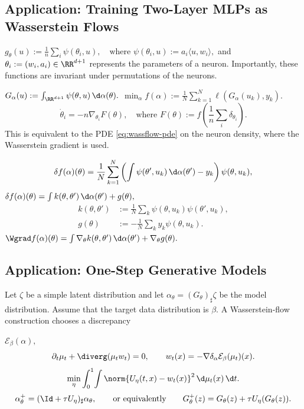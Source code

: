 \subsection{Application: Training Two-Layer MLPs as Wasserstein Flows}
\(g_\theta(u):= \frac{1}{n} \sum_i \psi(\theta_i, u), \quad \text{where } \psi(\theta_i, u):= a_i \langle u, w_i \rangle,\)
and $\theta_i:= (w_i, a_i) \in \RR^{d+1}$ represents the parameters of a neuron. Importantly, these functions are invariant under permutations of the neurons.

\(G_\alpha(u):= \int_{\RR^{d+1}} \psi(\theta, u) \, \d \alpha(\theta).\)
\(\min_\alpha f(\alpha):= \frac{1}{N} \sum_{k=1}^N \ell(G_\alpha(u_k), y_k).\)
\begin{equation*}
\dot{\theta}_i = -n\nabla_{\theta_i} F(\theta), \quad \text{where } F(\theta):= f\left(\frac{1}{n} \sum_i \delta_{\theta_i}\right).
\end{equation*}
This is equivalent to the PDE \eqref{eq:wassflow-pde} on the neuron density, where the Wasserstein gradient is used.

\begin{equation*}
\delta f(\alpha)(\theta) = \frac{1}{N} \sum_{k=1}^N \left(\int \psi(\theta', u_k) \, \d \alpha(\theta') - y_k\right) \psi(\theta, u_k),
\end{equation*}
\(\delta f(\alpha)(\theta) = \int k(\theta, \theta') \, \d \alpha(\theta') + g(\theta),\)
\begin{align}
k(\theta, \theta') &:= \frac{1}{N} \sum_k \psi(\theta, u_k) \psi(\theta', u_k), \\
g(\theta) &:= -\frac{1}{N} \sum_k y_k \psi(\theta, u_k).
\end{align}
\(\Wgrad f(\alpha)(\theta) = \int \nabla_\theta k(\theta, \theta') \, \d \alpha(\theta') + \nabla_\theta g(\theta).\)
\subsection{Application: One-Step Generative Models}
Let $\zeta$ be a simple latent distribution and let $\alpha_\theta=(G_\theta)_\sharp\zeta$ be the model distribution. Assume that the target data distribution is $\beta$. A Wasserstein-flow construction chooses a discrepancy

\(\mathcal E_\beta(\alpha),\)
\begin{equation}\label{eq-one-step-wgf}
\partial_t\mu_t+\diverg(\mu_t w_t)=0,
\qquad
w_t(x)=-\nabla\delta_\alpha \mathcal E_\beta(\mu_t)(x).
\end{equation}
\begin{equation}\label{eq-one-step-l2-fit}
\min_\eta \int_0^1\!\int
\norm{U_\eta(t,x)-w_t(x)}^2
\,\d\mu_t(x)\,\d t.
\end{equation}
\[
\alpha_{\theta}^{+}
=
(\Id+\tau U_\eta)_\sharp \alpha_\theta,
\qquad\text{or equivalently}\qquad
G_\theta^{+}(z)=G_\theta(z)+\tau U_\eta(G_\theta(z)).
\]
